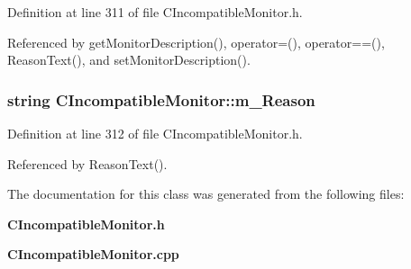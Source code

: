 Definition at line 311 of file CIncompatible\-Monitor.h.

Referenced by get\-Monitor\-Description(), operator=(), operator==(), Reason\-Text(), and set\-Monitor\-Description().
\subsubsection{\setlength{\rightskip}{0pt plus 5cm}string CIncompatible\-Monitor::m\_\-Reason\hspace{0.3cm}{\tt  [private]}}\label{classCIncompatibleMonitor_o1}




Definition at line 312 of file CIncompatible\-Monitor.h.

Referenced by Reason\-Text().

The documentation for this class was generated from the following files:\begin{CompactItemize}
\item 
{\bf CIncompatible\-Monitor.h}\item 
{\bf CIncompatible\-Monitor.cpp}\end{CompactItemize}
